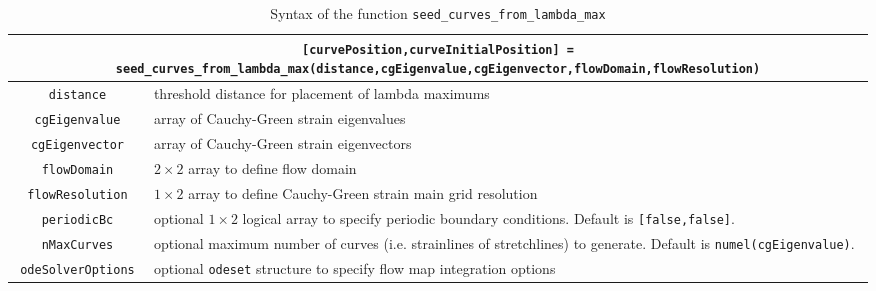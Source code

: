 \documentclass{article}
\begin{document}
\begin{table}
\begin{center}
\begin{tabular}{|c|p{}|}
\hline \hline
\multicolumn{2}{|p{\textwidth}|}{\lstinline![curvePosition,curveInitialPosition] = seed_curves_from_lambda_max(distance,cgEigenvalue,cgEigenvector,flowDomain,flowResolution)!}\\
\hline
\lstinline!distance! & threshold distance for placement of lambda maximums\\
\hline
\lstinline!cgEigenvalue! & array of Cauchy-Green strain eigenvalues\\
\hline
\lstinline!cgEigenvector! & array of Cauchy-Green strain eigenvectors\\
\hline
\lstinline!flowDomain! & $2 \times 2$ array to define flow domain\\
\hline
\lstinline!flowResolution! & $1 \times 2$ array to define Cauchy-Green strain main grid resolution\\
\hline
\lstinline!periodicBc! & optional $1 \times 2$ logical array to specify periodic boundary conditions. Default is \lstinline![false,false]!.\\
\hline
\lstinline!nMaxCurves! & optional maximum number of curves (i.e. strainlines of stretchlines) to generate. Default is \lstinline!numel(cgEigenvalue)!.\\
\hline
\lstinline!odeSolverOptions! & optional \lstinline!odeset! structure to specify flow map integration options\\
\hline \hline
\end{tabular}
\end{center}
\caption{Syntax of the function \lstinline!seed_curves_from_lambda_max!}
\label{t:seed_curves_from_lambda_max syntax}
\end{table}
\end{document}
